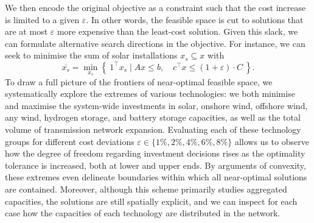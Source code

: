 We then encode the original objective as a constraint 
such that the cost increase is limited to a given $\varepsilon$.
In other words, the feasible space is cut to solutions that
are at most $\varepsilon$ more expensive than the least-cost solution.
Given this slack, we can formulate alternative search directions in the objective.
For instance, we can seek to minimise the sum of solar installations $x_s \subseteq x$ with
\begin{equation}
    \overline{x_s} = \min_{x_s}\left\{\: 1^\top x_s \mid Ax\leq b,\quad c^\top x\leq (1+\varepsilon)\cdot C \:\right\}.
\end{equation}
To draw a full picture of the frontiers of near-optimal feasible space, 
we systematically explore the extremes of various technologies:
we both minimise and maximise the system-wide investments in
solar, onshore wind, offshore wind, any wind, hydrogen storage, and battery storage
capacities, as well as the total volume of transmission network expansion.
Evaluating each of these technology groups for
different cost deviations $\varepsilon \in \{1\%,2\%,4\%,6\%,8\%\}$
allows us to observe how the degree of freedom regarding investment decisions
rises as the optimality tolerance is increased, both at lower and upper ends.
By arguments of convexity, these extremes even delineate boundaries
within which all near-optimal solutions are contained.
Moreover, although this scheme primarily studies aggregated capacities,
the solutions are still spatially explicit, and we can inspect for each case
how the capacities of each technology are distributed in the network.


